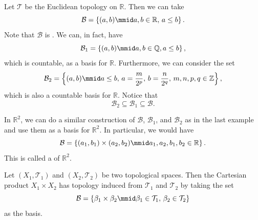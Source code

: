 \documentclass[notoc,notitlepage]{tufte-book}
\begin{document}
\begin{eg}
  Let $\mathcal{T}$ be the Euclidean topology on $\mathbb{R}$.
  Then we can take
  \begin{equation*}
    \mathcal{B} = \left\{ (a, b) \mmid a, b \in \mathbb{R}, \, a \leq b \right\}.
  \end{equation*}
  Note that $\mathcal{B}$ is .
  We can, in fact, have
  \begin{equation*}
    \mathcal{B}_1 = \left\{ (a, b) \mmid a, b \in \mathbb{Q}, a \leq b \right\},
  \end{equation*}
  which is countable, as a basis for $\mathbb{R}$.
  Furthermore, we can consider the set
  \begin{equation*}
    \mathcal{B}_2 = \left\{ (a, b) \mmid a \leq b, \, a = \frac{m}{2^p}, \, b = \frac{n}{2^q}, \, m, n, p, q \in \mathbb{Z} \right\},
  \end{equation*}
  which is also a countable basis for $\mathbb{R}$.
  Notice that
  \begin{equation*}
    \mathcal{B}_2 \subseteq \mathcal{B}_1 \subseteq \mathcal{B}.
  \end{equation*}
\end{eg}

\begin{eg}
  In $\mathbb{R}^2$, we can do a similar construction of $\mathcal{B}$,
  $\mathcal{B}_1$, and $\mathcal{B}_2$ as in the last example and use
  them as a basis for $\mathbb{R}^2$. In particular, we would have
  \begin{equation*}
    \mathcal{B} = \left\{ (a_1, b_1) \times (a_2, b_2) \mmid a_1, a_2, b_1, b_2 \in \mathbb{R} \right\}.
  \end{equation*}
  This is called a  of $\mathbb{R}^2$.
\end{eg}

\begin{eg}
  Let $(X_1, \mathcal{T}_1)$ and $(X_2, \mathcal{T}_2)$ be two topological spaces.
  Then the Cartesian product $X_1 \times X_2$ has topology induced
  from $\mathcal{T}_1$ and $\mathcal{T}_2$ by taking the set
  \begin{equation*}
    \mathcal{B} = \left\{ \beta_1 \times \beta_2 \mmid \beta_1 \in \mathcal{T}_1, \, \beta_2 \in \mathcal{T}_2 \right\}
  \end{equation*}
  as the basis.
\end{eg}
\end{document}
